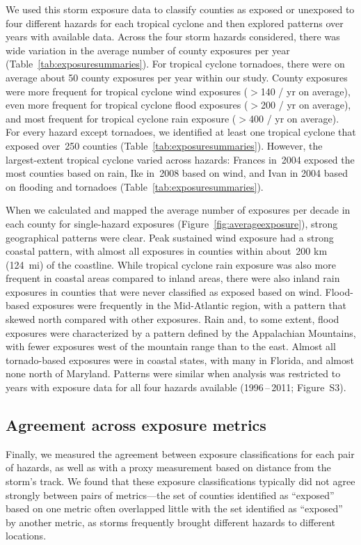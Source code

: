 We used this storm exposure data to classify counties as exposed or unexposed
to four different hazards for each tropical cyclone and then explored patterns
over years with available data. Across the four storm hazards considered, there
was wide variation in the average number of county exposures per year
(Table~\ref{tab:exposuresummaries}). For tropical cyclone tornadoes,
there were on average about 50 county exposures per year within our study.
County exposures were more frequent for tropical cyclone wind exposures ($>$140
/ yr on average), even more frequent for tropical cyclone flood exposures
($>$200 / yr on average), and most frequent for tropical cyclone rain exposure
($>$400 / yr on average). For every hazard except tornadoes, we identified at
least one tropical cyclone that exposed over~250 counties
(Table~\ref{tab:exposuresummaries}).  However, the largest-extent tropical
cyclone varied across hazards: Frances in~2004 exposed the most counties based
on rain, Ike in~2008 based on wind, and Ivan in 2004 based on flooding and
tornadoes (Table~\ref{tab:exposuresummaries}).

When we calculated and mapped the average number of exposures per decade in
each county for single-hazard exposures (Figure~\ref{fig:averageexposure}),
strong geographical patterns were clear. Peak sustained wind exposure had a
strong coastal pattern, with almost all exposures in counties within about~200
\si{\kilo\metre} (124~mi) of the coastline. While tropical cyclone rain
exposure was also more frequent in coastal areas compared to inland areas,
there were also inland rain exposures in counties that were never classified as
exposed based on wind. Flood-based exposures were frequently in the
Mid-Atlantic region, with a pattern that skewed north compared with other
exposures. Rain and, to some extent, flood exposures were characterized by a
pattern defined by the Appalachian Mountains, with fewer exposures west of the
mountain range than to the east. Almost all tornado-based exposures were in
coastal states, with many in Florida, and almost none north of Maryland.
Patterns were similar when analysis was restricted to years with exposure data
for all four hazards available (1996\,--\,2011; Figure~S3). 

\subsection*{Agreement across exposure metrics}

Finally, we measured the agreement between exposure classifications for each pair
of hazards, as well as with a proxy measurement based on
distance from the storm's track. We found that these exposure classifications
typically did not agree strongly between pairs of metrics---the set of counties
identified as ``exposed'' based on one metric often overlapped little with the set
identified as ``exposed'' by another metric, as storms frequently brought
different hazards to different locations. 


